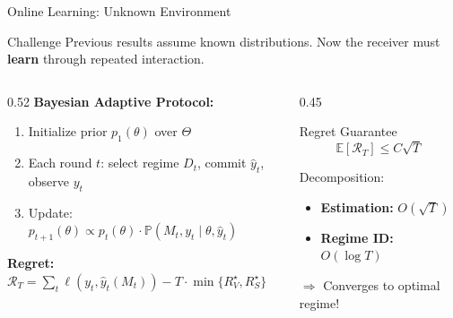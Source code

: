 \documentclass[aspectratio=169, 10pt]{beamer}
\newcommand{\E}{\mathbb{E}}
\newcommand{\Prob}{\mathbb{P}}
\begin{document}
\begin{frame}{Online Learning: Unknown Environment}
  \begin{alertblock}{Challenge}
    Previous results assume known distributions. Now the receiver must \textbf{learn} through repeated interaction.
  \end{alertblock}
  \vspace{2pt}
  \begin{columns}[T]
    \begin{column}{0.52\textwidth}
      \textbf{Bayesian Adaptive Protocol:}
      \begin{enumerate}
        \item Initialize prior $p_1(\theta)$ over $\Theta$
        \item Each round $t$: select regime $D_t$, commit $\hat{y}_t$, observe $y_t$
        \item Update: $p_{t+1}(\theta) \propto p_t(\theta) \cdot \Prob(M_t, y_t \mid \theta, \hat{y}_t)$
      \end{enumerate}
      \vspace{4pt}
      \textbf{Regret:} $\mathcal{R}_T = \sum_t \ell(y_t, \hat{y}_t(M_t)) - T \cdot \min\{R_V^\star, R_S^\star\}$
    \end{column}
    \begin{column}{0.45\textwidth}
      \begin{exampleblock}{\centering Regret Guarantee}
        \vspace{-2pt}
        $$\boxed{\E[\mathcal{R}_T] \le C\sqrt{T}}$$
        \vspace{-4pt}
        
        {\small Decomposition:}
        \begin{itemize}
          \item \textbf{Estimation:} $O(\sqrt{T})$
          \item \textbf{Regime ID:} $O(\log T)$
        \end{itemize}
        \vspace{2pt}
        {\small $\Rightarrow$ Converges to optimal regime!}
      \end{exampleblock}
    \end{column}
  \end{columns}
\end{frame}
\end{document}

